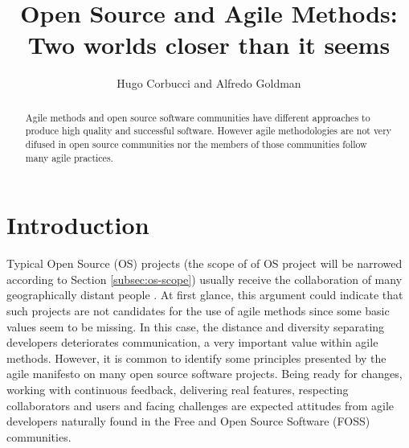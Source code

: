 \documentclass[lnbip]{svmultln}
\begin{document}
\title{Open Source and Agile Methods:\\Two worlds closer than it
  seems}


\author{Hugo Corbucci and Alfredo Goldman}



 
\maketitle

\begin{abstract}
  Agile methods and open source software communities have different
  approaches to produce high quality and successful software. However
  agile methodologies are not very difused in open source communities
  nor the members of those communities follow many agile
  practices.

\end{abstract}

\section{Introduction}

Typical Open Source (OS) projects (the scope of of OS project will be
narrowed according to Section \ref{subsec:os-scope}) usually receive
the collaboration of many geographically distant people
\cite{report:dempsey1999}. At first glance, this argument could
indicate that such projects are not candidates for the use of agile
methods since some basic values seem to be missing. In this case, the
distance and diversity separating developers deteriorates
communication, a very important value within agile methods. However,
it is common to identify some principles presented by the agile
manifesto \cite{url:agilemanifesto} on many open source software
projects. Being ready for changes, working with continuous feedback,
delivering real features, respecting collaborators and users and
facing challenges are expected attitudes from agile developers
naturally found in the Free and Open Source Software (FOSS)
communities\cite{gabriel2005}.
\end{document}

